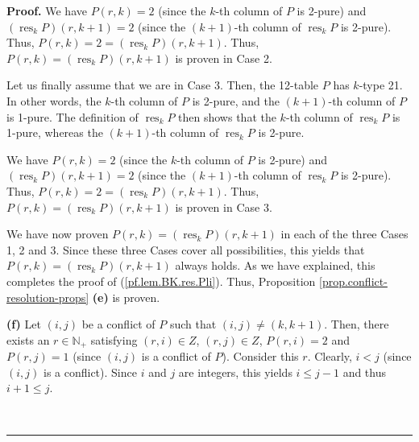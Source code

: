 \documentclass[numbers=enddot,12pt,final,onecolumn,notitlepage]{scrartcl}%
\theoremstyle{definition}
\newenvironment{proof}[1][Proof]{\noindent\textbf{#1.} }{\ \rule{0.5em}{0.5em}}
\newenvironment{verlong}{}{}
\begin{document}
\begin{verlong}
\begin{proof}
We have $P\left(  r,k\right)  =2$ (since the $k$-th column of $P$ is 2-pure)
and $\left(  \operatorname*{res}\nolimits_{k}P\right)  \left(  r,k+1\right)
=2$ (since the $\left(  k+1\right)  $-th column of $\operatorname*{res}%
\nolimits_{k}P$ is 2-pure). Thus, $P\left(  r,k\right)  =2=\left(
\operatorname*{res}\nolimits_{k}P\right)  \left(  r,k+1\right)  $. Thus,
$P\left(  r,k\right)  =\left(  \operatorname*{res}\nolimits_{k}P\right)
\left(  r,k+1\right)  $ is proven in Case 2.

Let us finally assume that we are in Case 3. Then, the 12-table $P$ has
$k$-type 21. In other words, the $k$-th column of $P$ is 2-pure, and the
$\left(  k+1\right)  $-th column of $P$ is 1-pure. The definition of
$\operatorname*{res}\nolimits_{k}P$ then shows that the $k$-th column of
$\operatorname*{res}_{k}P$ is 1-pure, whereas the $\left(  k+1\right)  $-th
column of $\operatorname*{res}\nolimits_{k}P$ is 2-pure.

We have $P\left(  r,k\right)  =2$ (since the $k$-th column of $P$ is 2-pure)
and $\left(  \operatorname*{res}\nolimits_{k}P\right)  \left(  r,k+1\right)
=2$ (since the $\left(  k+1\right)  $-th column of $\operatorname*{res}%
\nolimits_{k}P$ is 2-pure). Thus, $P\left(  r,k\right)  =2=\left(
\operatorname*{res}\nolimits_{k}P\right)  \left(  r,k+1\right)  $. Thus,
$P\left(  r,k\right)  =\left(  \operatorname*{res}\nolimits_{k}P\right)
\left(  r,k+1\right)  $ is proven in Case 3.

We have now proven $P\left(  r,k\right)  =\left(  \operatorname*{res}%
\nolimits_{k}P\right)  \left(  r,k+1\right)  $ in each of the three Cases 1, 2
and 3. Since these three Cases cover all possibilities, this yields that
$P\left(  r,k\right)  =\left(  \operatorname*{res}\nolimits_{k}P\right)
\left(  r,k+1\right)  $ always holds. As we have explained, this completes the
proof of (\ref{pf.lem.BK.res.Pli}). Thus, Proposition
\ref{prop.conflict-resolution-props} \textbf{(e)} is proven.

\textbf{(f)} Let $\left(  i,j\right)  $ be a conflict of $P$ such that
$\left(  i,j\right)  \neq\left(  k,k+1\right)  $. Then, there exists an
$r\in\mathbb{N}_{+}$ satisfying $\left(  r,i\right)  \in Z$, $\left(
r,j\right)  \in Z$, $P\left(  r,i\right)  =2$ and $P\left(  r,j\right)  =1$
(since $\left(  i,j\right)  $ is a conflict of $P$). Consider this $r$.
Clearly, $i<j$ (since $\left(  i,j\right)  $ is a conflict). Since $i$ and $j$
are integers, this yields $i\leq j-1$ and thus $i+1\leq j$.


\end{proof}
\end{verlong}
\end{document}
